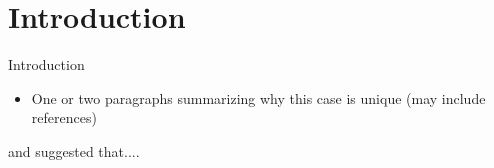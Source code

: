 \section{Introduction}
\begin{frame}[]{Introduction}

\begin{itemize}
    \item One or two paragraphs summarizing why this case is unique (may include references)
\end{itemize}

\parencite{dass2012ocular} and \parencite{almahmoud2019epidemiology} suggested that....


\end{frame}
